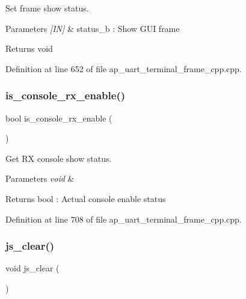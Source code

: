 Set frame show status. 


\begin{DoxyParams}{Parameters}
{\em \mbox{[}\+I\+N\mbox{]}} & status\+\_\+b \+: Show G\+UI frame \\
\hline
\end{DoxyParams}
\begin{DoxyReturn}{Returns}
void 
\end{DoxyReturn}


Definition at line 652 of file ap\+\_\+uart\+\_\+terminal\+\_\+frame\+\_\+cpp.\+cpp.

\mbox{\label{group___u_a_r_t__terminal_ga7ba59ce4eb6c8eb6bdf549389b59ef43}} 
\subsubsection{is\_console\_rx\_enable()}
{\footnotesize\ttfamily bool is\+\_\+console\+\_\+rx\+\_\+enable (\begin{DoxyParamCaption}\item[{void}]{ }\end{DoxyParamCaption})}



Get RX console show status. 


\begin{DoxyParams}{Parameters}
{\em void} & \\
\hline
\end{DoxyParams}
\begin{DoxyReturn}{Returns}
bool \+: Actual console enable status 
\end{DoxyReturn}


Definition at line 708 of file ap\+\_\+uart\+\_\+terminal\+\_\+frame\+\_\+cpp.\+cpp.

\mbox{\label{group___u_a_r_t__terminal_ga7ba591b2947aec3954c417ad07bc8294}} 
\subsubsection{js\_clear()}
{\footnotesize\ttfamily void js\+\_\+clear (\begin{DoxyParamCaption}\item[{void}]{ }\end{DoxyParamCaption})}



